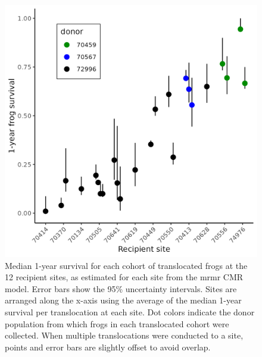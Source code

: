 \documentclass[
  letterpaper,
  DIV=11,
  numbers=noendperiod]{scrartcl}
\begin{document}
\newpage

\begin{figure}

{\centering \includegraphics[width=4.6875in,height=\textheight]{figures/translocation_survival_bysiteid.png}

}

\caption{\label{fig-translocation-survival}Median 1-year survival for
each cohort of translocated frogs at the 12 recipient sites, as
estimated for each site from the mrmr CMR model. Error bars show the
95\% uncertainty intervals. Sites are arranged along the x-axis using
the average of the median 1-year survival per translocation at each
site. Dot colors indicate the donor population from which frogs in each
translocated cohort were collected. When multiple translocations were
conducted to a site, points and error bars are slightly offset to avoid
overlap.}

\end{figure}

\newpage
\end{document}
